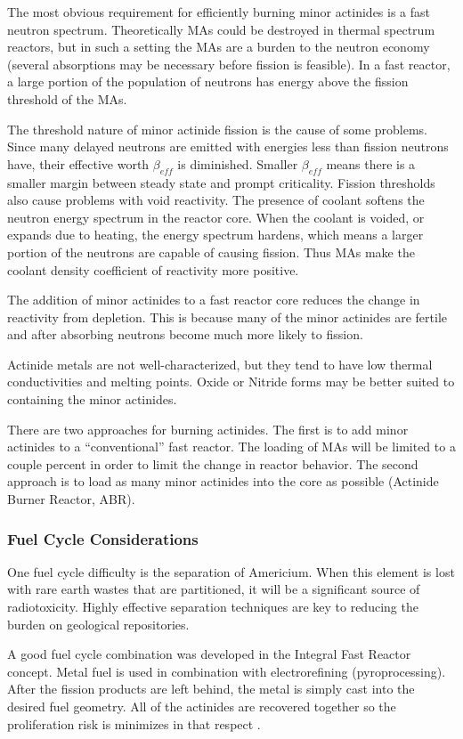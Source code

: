 \documentclass[]{report}
\begin{document}
The most obvious requirement for efficiently burning minor actinides is a fast neutron spectrum. Theoretically MAs could be destroyed in thermal spectrum reactors, but in such a setting the MAs are a burden to the neutron economy (several absorptions may be necessary before fission is feasible). 
In a fast reactor, a large portion of the population of neutrons has energy above the fission threshold of the MAs.

The threshold nature of minor actinide fission is the cause of some problems. Since many delayed neutrons are emitted with energies less than fission neutrons have, their effective worth $\beta_{eff}$ is diminished. Smaller $\beta_{eff}$ means there is a smaller margin between steady state and prompt criticality.
Fission thresholds also cause problems with void reactivity. The presence of coolant softens the neutron energy spectrum in the reactor core. When the coolant is voided, or expands due to heating, the energy spectrum hardens, which means a larger portion of the neutrons are capable of causing fission. Thus MAs make the coolant density coefficient of reactivity more positive.

The addition of minor actinides to a fast reactor core reduces the change in reactivity from depletion. This is because many of the minor actinides are fertile and after absorbing neutrons become much more likely to fission.

Actinide metals are not well-characterized, but they tend to have low thermal conductivities and melting points. Oxide or Nitride forms may be better suited to containing the minor actinides.


There are two approaches for burning actinides. The first is to add minor actinides to a ``conventional'' fast reactor. The loading of MAs will be limited to a couple percent in order to limit the change in reactor behavior.
The second approach is to load as many minor actinides into the core as possible (Actinide Burner Reactor, ABR).

\subsubsection{Fuel Cycle Considerations}
One fuel cycle difficulty is the separation of Americium. When this element is lost with rare earth wastes that are partitioned, it will be a significant source of radiotoxicity. Highly effective separation techniques are key to reducing the burden on geological repositories.

A good fuel cycle combination was developed in the Integral Fast Reactor concept. Metal fuel is used in combination with electrorefining (pyroprocessing). After the fission products are left behind, the metal is simply cast into the desired fuel geometry. All of the actinides are recovered together so the proliferation risk is minimizes in that respect \cite{IAEA_MA}.






\end{document}
